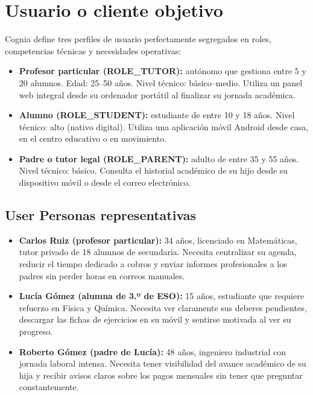 \documentclass[12pt,a4paper]{report}
\begin{document}
\section{Usuario o cliente objetivo}

Cognia define tres perfiles de usuario perfectamente segregados en roles,
competencias técnicas y necesidades operativas:

\begin{itemize}
    \item \textbf{Profesor particular (ROLE\_TUTOR):} autónomo que
    gestiona entre 5 y 20 alumnos. Edad: 25--50 años. Nivel técnico:
    básico--medio. Utiliza un panel web integral desde su ordenador
    portátil al finalizar su jornada académica.
    \item \textbf{Alumno (ROLE\_STUDENT):} estudiante de entre 10 y 18
    años. Nivel técnico: alto (nativo digital). Utiliza una aplicación
    móvil Android desde casa, en el centro educativo o en movimiento.
    \item \textbf{Padre o tutor legal (ROLE\_PARENT):} adulto de entre 35
    y 55 años. Nivel técnico: básico. Consulta el historial académico de
    su hijo desde su dispositivo móvil o desde el correo electrónico.
\end{itemize}

\subsection*{User Personas representativas}

\begin{itemize}
    \item \textbf{Carlos Ruiz (profesor particular):} 34 años,
    licenciado en Matemáticas, tutor privado de 18 alumnos de secundaria.
    Necesita centralizar su agenda, reducir el tiempo dedicado a cobros y
    enviar informes profesionales a los padres sin perder horas en
    correos manuales.
    \item \textbf{Lucía Gómez (alumna de 3.º de ESO):} 15 años,
    estudiante que requiere refuerzo en Física y Química. Necesita ver
    claramente sus deberes pendientes, descargar las fichas de ejercicios
    en su móvil y sentirse motivada al ver su progreso.
    \item \textbf{Roberto Gómez (padre de Lucía):} 48 años, ingeniero
    industrial con jornada laboral intensa. Necesita tener visibilidad
    del avance académico de su hija y recibir avisos claros sobre los
    pagos mensuales sin tener que preguntar constantemente.
\end{itemize}
\end{document}
